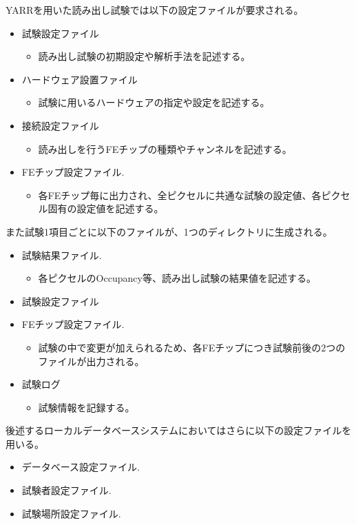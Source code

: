 YARRを用いた読み出し試験では以下の設定ファイルが要求される。
\begin{itemize}
  \item 試験設定ファイル
  \begin{itemize}
    \item 読み出し試験の初期設定や解析手法を記述する。
  \end{itemize}
  \item ハードウェア設置ファイル
  \begin{itemize}
    \item 試験に用いるハードウェアの指定や設定を記述する。
  \end{itemize}
  \item 接続設定ファイル
  \begin{itemize}
    \item 読み出しを行うFEチップの種類やチャンネルを記述する。
  \end{itemize}  
  \item FEチップ設定ファイル.
  \begin{itemize}
    \item 各FEチップ毎に出力され、全ピクセルに共通な試験の設定値、各ピクセル固有の設定値を記述する。
  \end{itemize}  
\end{itemize}

また試験1項目ごとに以下のファイルが、1つのディレクトリに生成される。
\begin{itemize}
  \item 試験結果ファイル.
  \begin{itemize}
    \item 各ピクセルのOccupancy等、読み出し試験の結果値を記述する。
  \end{itemize}
  \item 試験設定ファイル
  \item FEチップ設定ファイル.
  \begin{itemize}
    \item 試験の中で変更が加えられるため、各FEチップにつき試験前後の2つのファイルが出力される。
  \end{itemize}
  \item 試験ログ
  \begin{itemize}
    \item 試験情報を記録する。
  \end{itemize}
\end{itemize}

後述するローカルデータベースシステムにおいてはさらに以下の設定ファイルを用いる。
\begin{itemize}
  \item データベース設定ファイル.
  \item 試験者設定ファイル. 
  \item 試験場所設定ファイル.
\end{itemize}

